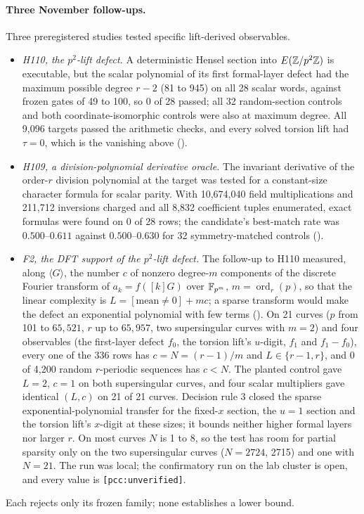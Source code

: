 \paragraph{Three November follow-ups.} Three preregistered studies tested
specific lift-derived observables.
\begin{itemize}
\item \emph{H110, the $p^2$-lift defect.} A deterministic Hensel section
  into $E(\mathbb{Z}/p^2\mathbb{Z})$ is executable, but the scalar polynomial of its
  first formal-layer defect had the maximum possible degree $r-2$ (81 to
  945) on all 28 scalar words, against frozen gates of 49 to 100, so 0 of
  28 passed; all 32 random-section controls and both coordinate-isomorphic
  controls were also at maximum degree. All 9{,}096 targets passed the
  arithmetic checks, and every solved torsion lift had $\tau=0$, which is
  the vanishing above ().
\item \emph{H109, a division-polynomial derivative oracle.} The invariant
  derivative of the order-$r$ division polynomial at the target was tested
  for a constant-size character formula for scalar parity. With
  10{,}674{,}040 field multiplications and 211{,}712 inversions charged and
  all 8{,}832 coefficient tuples enumerated, exact formulas were found on 0
  of 28 rows; the candidate's best-match rate was $0.500$--$0.611$ against
  $0.500$--$0.630$ for 32 symmetry-matched controls
  ().
\item \emph{F2, the DFT support of the $p^2$-lift defect.} The follow-up to
  H110 measured, along $\langle G\rangle$, the number $c$ of nonzero
  degree-$m$ components of the discrete Fourier transform of $a_k=f([k]G)$
  over $\mathbb{F}_{p^m}$, $m=\operatorname{ord}_r(p)$, so that the linear
  complexity is $L=[\text{mean}\ne0]+mc$; a sparse transform would make the
  defect an exponential polynomial with few terms
  (). On 21 curves
  ($p$ from 101 to $65{,}521$, $r$ up to $65{,}957$, two supersingular curves with
  $m=2$) and four observables (the first-layer defect $f_0$, the torsion
  lift's $u$-digit, $f_1$ and $f_1-f_0$), every one of the 336 rows has
  $c=N=(r-1)/m$ and $L\in\{r-1,r\}$, and 0 of 4{,}200 random $r$-periodic
  sequences has $c<N$. The planted control gave $L=2$, $c=1$ on both
  supersingular curves, and four scalar multipliers gave identical
  $(L,c)$ on 21 of 21 curves. Decision rule 3 closed the sparse
  exponential-polynomial transfer for the fixed-$x$ section, the $u=1$
  section and the torsion lift's $x$-digit at these sizes; it bounds neither
  higher formal layers nor larger $r$. On most curves $N$ is 1 to 8, so the
  test has room for partial sparsity only on the two supersingular curves
  ($N=2724$, 2715) and one with $N=21$. The run was local; the confirmatory
  run on the lab cluster is open, and every value is
  \texttt{[pcc:unverified]}.
\end{itemize}
Each rejects only its frozen family; none establishes a lower bound.

